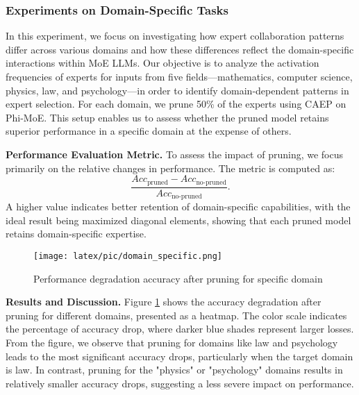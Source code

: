 \documentclass[11pt]{article}
\begin{document}



\subsubsection{Experiments on Domain-Specific Tasks}
In this experiment, we focus on investigating how expert collaboration patterns differ across various domains and how these differences reflect the domain-specific interactions within MoE LLMs. Our objective is to analyze the activation frequencies of experts for inputs from five fields—mathematics, computer science, physics, law, and psychology—in order to identify domain-dependent patterns in expert selection. For each domain, we prune 50\% of the experts using CAEP on Phi-MoE. This setup enables us to assess whether the pruned model retains superior performance in a specific domain at the expense of others.



\textbf{Performance Evaluation Metric.}  
To assess the impact of pruning, we focus primarily on the relative changes in performance. The metric is computed as:
\begin{equation}
\frac{Acc_{\text{pruned}} - Acc_{\text{no-pruned}}}{Acc_{\text{no-pruned}}}.
\end{equation}
A higher value indicates better retention of domain-specific capabilities, with the ideal result being maximized diagonal elements, showing that each pruned model retains domain-specific expertise.

\begin{figure}[ht]
    \centering
    \texttt{[image: latex/pic/domain\_specific.png]}
    \caption{Performance degradation accuracy after pruning for specific domain}
    \label{fig:heatmap}
\end{figure}

\textbf{Results and Discussion.} Figure \ref{fig:heatmap} shows the accuracy degradation after pruning for different domains, presented as a heatmap. The color scale indicates the percentage of accuracy drop, where darker blue shades represent larger losses. From the figure, we observe that pruning for domains like law and psychology leads to the most significant accuracy drops, particularly when the target domain is law. In contrast, pruning for the "physics" or "psychology" domains results in relatively smaller accuracy drops, suggesting a less severe impact on performance.
\end{document}

